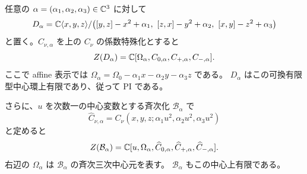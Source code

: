 \begin{theorem}[全定数変形での有限中心性]\label{cmo:thm:finite-center}
任意の $\alpha=(\alpha_1,\alpha_2,\alpha_3)\in\mathbb C^3$ に対して
\[
 D_\alpha=\mathbb C\langle x,y,z\rangle/
 \bigl([y,z]-x^2+\alpha_1,\ [z,x]-y^2+\alpha_2,
       \ [x,y]-z^2+\alpha_3\bigr)
\]
と置く。$C_{\nu,\alpha}$ を上の $C_\nu$ の係数特殊化とすると
\begin{equation}\label{cmo:eq:affine-center-generators}
 Z(D_\alpha)=\mathbb C[\Omega_\alpha,C_{0,\alpha},C_{+,\alpha},C_{-,\alpha}].
\end{equation}
ここで affine 表示では
$\Omega_\alpha=\Omega_0-\alpha_1x-\alpha_2y-\alpha_3z$ である。
$D_\alpha$ はこの可換有限型中心環上有限であり、従って PI である。

さらに、$u$ を次数一の中心変数とする斉次化 $\mathcal B_\alpha$ で
\[
 \widehat C_{\nu,\alpha}
     =C_\nu(x,y,z;\alpha_1u^2,\alpha_2u^2,\alpha_3u^2)
\]
と定めると
\begin{equation}\label{cmo:eq:homogeneous-center-generators}
 Z(\mathcal B_\alpha)=\mathbb C[u,\Omega_\alpha,
             \widehat C_{0,\alpha},\widehat C_{+,\alpha},\widehat C_{-,\alpha}].
\end{equation}
右辺の $\Omega_\alpha$ は $\mathcal B_\alpha$ の斉次三次中心元を表す。
$\mathcal B_\alpha$ もこの中心上有限である。
\end{theorem}

